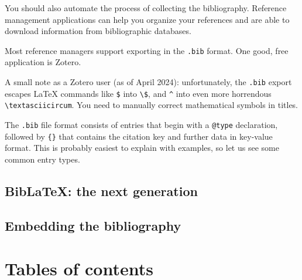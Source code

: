 \begin{practices}
You should also automate the process of collecting the bibliography.
Reference management applications can help you organize your references
and are able to download information from bibliographic databases.

Most reference managers support exporting in the \verb|.bib| format.
One good, free application is Zotero\footnotemark.

A small note as a Zotero user (as of April 2024):
unfortunately, the \verb|.bib| export escapes \LaTeX{} commands like \verb|$| into \verb|\$|,
and \verb|^| into even more horrendous \verb|\textasciicircum|.
You need to manually correct mathematical symbols in titles.
\end{practices}

The \verb|.bib| file format consists of entries that begin with a \verb|@type| declaration,
followed by \verb|{}| that contains the citation key
and further data in key-value format.
This is probably easiest to explain with examples,
so let us see some common entry types.









%
\subsection{BibLaTeX: the next generation}




%
\subsection{Embedding the bibliography}




%
%
%
\section{Tables of contents}

